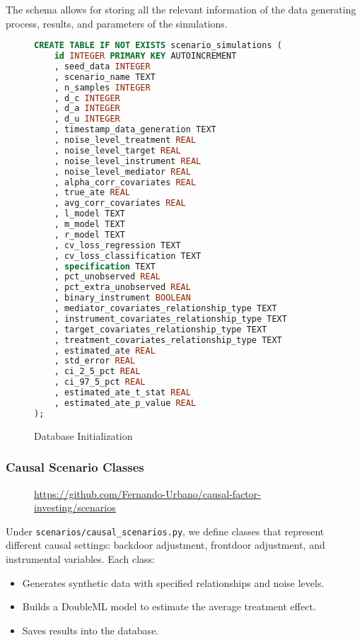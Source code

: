 \documentclass{article}
\numberwithin{equation}{section}
\begin{document}
The schema allows for storing all the relevant information of the data generating process, results, and parameters of the simulations.

\begin{figure}[H]
    \begin{lstlisting}[language=sql]
CREATE TABLE IF NOT EXISTS scenario_simulations (
    id INTEGER PRIMARY KEY AUTOINCREMENT
    , seed_data INTEGER
    , scenario_name TEXT
    , n_samples INTEGER
    , d_c INTEGER
    , d_a INTEGER
    , d_u INTEGER
    , timestamp_data_generation TEXT      
    , noise_level_treatment REAL
    , noise_level_target REAL
    , noise_level_instrument REAL
    , noise_level_mediator REAL  
    , alpha_corr_covariates REAL
    , true_ate REAL
    , avg_corr_covariates REAL
    , l_model TEXT
    , m_model TEXT
    , r_model TEXT
    , cv_loss_regression TEXT
    , cv_loss_classification TEXT
    , specification TEXT
    , pct_unobserved REAL
    , pct_extra_unobserved REAL
    , binary_instrument BOOLEAN            
    , mediator_covariates_relationship_type TEXT  
    , instrument_covariates_relationship_type TEXT  
    , target_covariates_relationship_type TEXT       
    , treatment_covariates_relationship_type TEXT    
    , estimated_ate REAL
    , std_error REAL
    , ci_2_5_pct REAL
    , ci_97_5_pct REAL
    , estimated_ate_t_stat REAL
    , estimated_ate_p_value REAL
);
\end{lstlisting}
\caption{Database Initialization}
\end{figure}

\subsubsection{Causal Scenario Classes}

\begin{figure}[H]
    \centering
    \url{https://github.com/Fernando-Urbano/causal-factor-investing/scenarios}
\end{figure}

Under \texttt{scenarios/causal\_scenarios.py}, we define classes that represent different causal settings: backdoor adjustment, frontdoor adjustment, and instrumental variables. Each class:

\begin{itemize}
    \item Generates synthetic data with specified relationships and noise levels.
    \item Builds a DoubleML model to estimate the average treatment effect.
    \item Saves results into the database.
\end{itemize}
\end{document}
